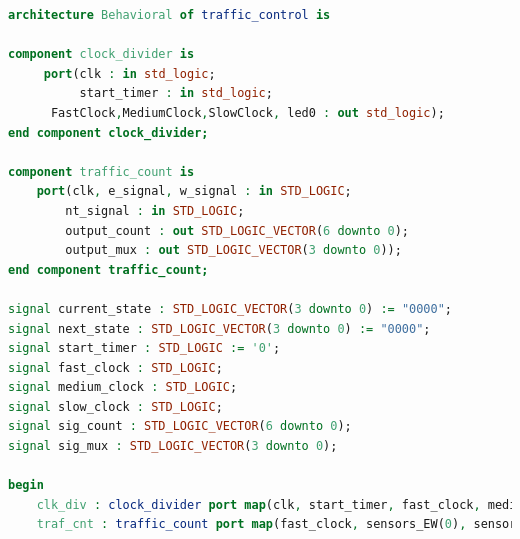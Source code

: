\documentclass[11pt]{article}
\begin{document}
\begin{appendices}
\begin{lstlisting}[language=VHDL]
architecture Behavioral of traffic_control is

component clock_divider is
     port(clk : in std_logic;
          start_timer : in std_logic;
	  FastClock,MediumClock,SlowClock, led0 : out std_logic);
end component clock_divider;

component traffic_count is
    port(clk, e_signal, w_signal : in STD_LOGIC;
        nt_signal : in STD_LOGIC;
        output_count : out STD_LOGIC_VECTOR(6 downto 0);
        output_mux : out STD_LOGIC_VECTOR(3 downto 0));
end component traffic_count;

signal current_state : STD_LOGIC_VECTOR(3 downto 0) := "0000";
signal next_state : STD_LOGIC_VECTOR(3 downto 0) := "0000";
signal start_timer : STD_LOGIC := '0';
signal fast_clock : STD_LOGIC;
signal medium_clock : STD_LOGIC;
signal slow_clock : STD_LOGIC;
signal sig_count : STD_LOGIC_VECTOR(6 downto 0);
signal sig_mux : STD_LOGIC_VECTOR(3 downto 0);

begin
    clk_div : clock_divider port map(clk, start_timer, fast_clock, medium_clock, slow_clock, clock_led);
    traf_cnt : traffic_count port map(fast_clock, sensors_EW(0), sensors_EW(1), sensor_NT, sig_count, sig_mux);
    

\end{lstlisting}
\end{appendices}
\end{document}

